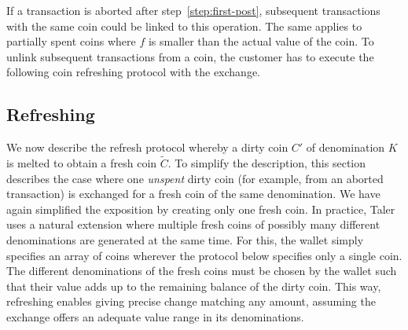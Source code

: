 \documentclass[sigconf, authordraft]{acmart}
\begin{document}
If a transaction is aborted after step~\ref{step:first-post}, subsequent
transactions with the same coin could be linked to this operation.
The same applies to partially spent coins where $f$ is smaller than
the actual value of the coin.  To unlink subsequent transactions from
a coin, the customer has to execute the following coin refreshing
protocol with the exchange.

%
%
%


\subsection{Refreshing} \label{sec:refreshing}

We now describe the refresh protocol whereby a dirty coin $C'$ of
denomination $K$ is melted to obtain a fresh coin $\widetilde{C}$.  To
simplify the description, this section describes the case where one
{\em unspent} dirty coin (for example, from an aborted transaction) is
exchanged for a fresh coin of the same denomination.  We have again
simplified the exposition by creating only one fresh coin.  In practice,
Taler uses a natural extension where multiple fresh coins of possibly
many different denominations are generated at the same time. For this,
the wallet simply specifies an array of coins wherever the protocol
below specifies only a single coin. The different denominations of the
fresh coins must be chosen by the wallet such that their value adds up
to the remaining balance of the dirty coin.  This way, refreshing
enables giving precise change matching any amount, assuming the
exchange offers an adequate value range in its denominations.
\end{document}
